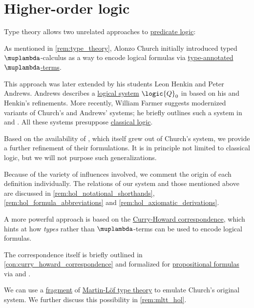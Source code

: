 \section{Higher-order logic}\label{sec:higher_order_logic}

\begin{remark}\label{rem:higher_order_logic_and_type_theory}
  Type theory allows two unrelated approaches to \hyperref[con:predicate_logic]{predicate logic}:
  \begin{thmenum}
     As mentioned in \cref{rem:type_theory}, Alonzo Church initially introduced typed \( \muplambda \)-calculus as a way to encode logical formulas via \hyperref[con:type_annotation]{type-annotated} \hyperref[def:lambda_term]{\( \muplambda \)-terms}.

    This approach was later extended by his students Leon Henkin and Peter Andrews. Andrews describes a \hyperref[con:logical_system]{logical system} \( \logic{Q}_0 \) in \cite[ch. 5]{Andrews2002Logic} based on his and Henkin's refinements. More recently, William Farmer suggests modernized variants of Church's and Andrews' systems; he briefly outlines such a system in \cite{Farmer2008STTVirtues} and \cite{Farmer1990PartialFunctionSTT}. All these systems presuppose \hyperref[con:classical_logic]{classical logic}.

    Based on the availability of , which itself grew out of Church's system, we provide a further refinement of their formulations. It is in principle not limited to classical logic, but we will not purpose such generalizations.

    Because of the variety of influences involved, we comment the origin of each definition individually. The relations of our system and those mentioned above are discussed in \cref{rem:hol_notational_shorthands}, \cref{rem:hol_formula_abbreviations} and \cref{rem:hol_axiomatic_derivations}.

     A more powerful approach is based on the \hyperref[con:curry_howard_correspondence]{Curry-Howard correspondence}, which hints at how \emph{types} rather than \( \muplambda \)-terms can be used to encode logical formulas.

    The correspondence itself is briefly outlined in \cref{con:curry_howard_correspondence} and formalized for \hyperref[def:propositional_formula]{propositional formulas} via  and .

    We can use a \hyperref[con:syntax_fragment]{fragment} of \hyperref[def:martin_lof_type_theory]{Martin-L\"of type theory} to emulate Church's original system. We further discuss this possibility in \cref{rem:mltt_hol}.
  \end{thmenum}
\end{remark}

